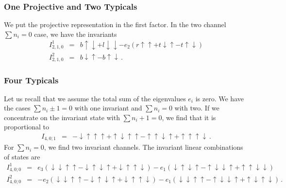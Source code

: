 \documentclass[12pt]{article}
\numberwithin{equation}{section}
\numberwithin{equation}{section}
\numberwithin{table}{section}\setlength{\multlinegap}{25pt}
\begin{document}
\subsubsection{One Projective and Two Typicals}
We put the projective representation in the first factor.
In the two channel $\sum n_i=0$ case, we have the invariants
\begin{eqnarray}
I^1_{2,1,0} &=& b \! \uparrow \downarrow + 
 l \! \downarrow \downarrow - 
e_2 (r \! \uparrow \uparrow + 
    t \! \downarrow \uparrow - 
    t \!  \uparrow \downarrow)
\nonumber \\
I^2_{2,1,0} &=& b \! \downarrow \uparrow -  b \! \uparrow \downarrow \, .
\end{eqnarray}
\subsubsection{Four Typicals}
\label{fourtypicalsinvariants}
Let us recall that we assume the total sum of the eigenvalues $e_i$ is zero. We have the cases $\sum n_i \pm 1=0$ with one invariant
and $\sum n_i =0$ with two.
If we concentrate on the invariant state with $\sum n_i+1=0$, we find that it is proportional to
\begin{eqnarray}
I_{4,0;1} &=&- \downarrow \uparrow \uparrow \uparrow +
   \uparrow \downarrow \uparrow \uparrow  -  \uparrow \uparrow \downarrow \uparrow +
  \uparrow \uparrow \uparrow \downarrow  \, .
\end{eqnarray}
For $\sum n_i=0$, we find two invariant channels. The invariant
linear combinations of states are
\begin{eqnarray}
I_{4,0;0}^1 &=&  e_3 ( \downarrow \downarrow \uparrow \uparrow  -
   \downarrow \uparrow \downarrow \uparrow  +    \downarrow \uparrow \uparrow \downarrow )
- e_1 (  \downarrow \uparrow \downarrow \uparrow  -
   \uparrow \downarrow  \downarrow \uparrow +     \uparrow \uparrow \downarrow \downarrow)
\nonumber \\
I_{4,0;0}^2 &=& -
 e_2 (  \downarrow \downarrow \uparrow \uparrow  -
    \downarrow \uparrow \downarrow \uparrow +    \downarrow \uparrow \uparrow \downarrow )
- e_1 (  \downarrow \downarrow  \uparrow \uparrow  -
    \uparrow \downarrow  \downarrow \uparrow  +     \uparrow  \downarrow \uparrow \downarrow ) \, .
\end{eqnarray}
\end{document}
